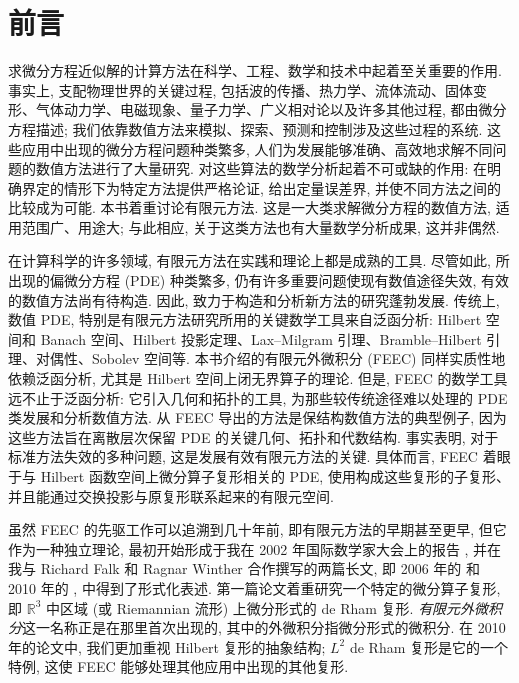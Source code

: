 \section*{{前言}}\label{sec:preface}

{求微分方程近似解的计算方法在科学、工程、数学和技术中起着至关重要的作用. 事实上, 支配物理世界的关键过程, 包括波的传播、热力学、流体流动、固体变形、气体动力学、电磁现象、量子力学、广义相对论以及许多其他过程, 都由微分方程描述; 我们依靠数值方法来模拟、探索、预测和控制涉及这些过程的系统. 这些应用中出现的微分方程问题种类繁多, 人们为发展能够准确、高效地求解不同问题的数值方法进行了大量研究. 对这些算法的数学分析起着不可或缺的作用: 在明确界定的情形下为特定方法提供严格论证, 给出定量误差界, 并使不同方法之间的比较成为可能. 本书着重讨论有限元方法. 这是一大类求解微分方程的数值方法, 适用范围广、用途大; 与此相应, 关于这类方法也有大量数学分析成果, 这并非偶然.}

{在计算科学的许多领域, 有限元方法在实践和理论上都是成熟的工具. 尽管如此, 所出现的偏微分方程 (PDE) 种类繁多, 仍有许多重要问题使现有数值途径失效, 有效的数值方法尚有待构造. 因此, 致力于构造和分析新方法的研究蓬勃发展. 传统上, 数值 PDE, 特别是有限元方法研究所用的关键数学工具来自泛函分析: Hilbert 空间和 Banach 空间、Hilbert 投影定理、Lax–Milgram 引理、Bramble–Hilbert 引理、对偶性、Sobolev 空间等. 本书介绍的有限元外微积分 (FEEC) 同样实质性地依赖泛函分析, 尤其是 Hilbert 空间上闭无界算子的理论. 但是, FEEC 的数学工具远不止于泛函分析: 它引入几何和拓扑的工具, 为那些较传统途径难以处理的 PDE 类发展和分析数值方法. 从 FEEC 导出的方法是保结构数值方法的典型例子, 因为这些方法旨在离散层次保留 PDE 的关键几何、拓扑和代数结构. 事实表明, 对于标准方法失效的多种问题, 这是发展有效有限元方法的关键. 具体而言, FEEC 着眼于与 Hilbert 函数空间上微分算子复形相关的 PDE, 使用构成这些复形的子复形、并且能通过交换投影与原复形联系起来的有限元空间.}

{虽然 FEEC 的先驱工作可以追溯到几十年前, 即有限元方法的早期甚至更早, 但它作为一种独立理论, 最初开始形成于我在 2002 年国际数学家大会上的报告 , 并在我与 Richard Falk 和 Ragnar Winther 合作撰写的两篇长文, 即 2006 年的  和 2010 年的 , 中得到了形式化表述. 第一篇论文着重研究一个特定的微分算子复形, 即 $\mathbb R^3$ 中区域 (或 Riemannian 流形) 上微分形式的 de Rham 复形. \emph{有限元外微积分}这一名称正是在那里首次出现的, 其中的外微积分指微分形式的微积分. 在 2010 年的论文中, 我们更加重视 Hilbert 复形的抽象结构; $L^2$ de Rham 复形是它的一个特例, 这使 FEEC 能够处理其他应用中出现的其他复形.}

